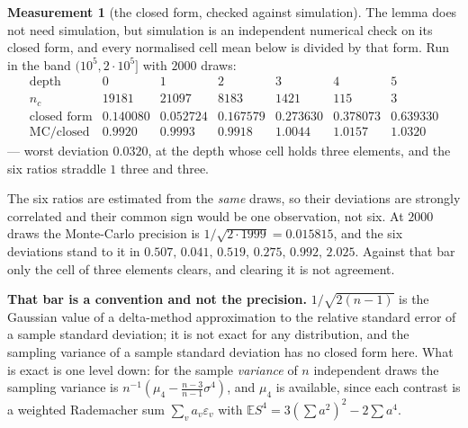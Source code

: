 \documentclass[11pt,a4paper]{article}
\theoremstyle{plain}
\theoremstyle{definition}
\newtheorem{measurement}[theorem]{Measurement}
\theoremstyle{remark}
\begin{document}
\begin{measurement}[the closed form, checked against simulation]%
\label{meas:mc}
The lemma does not need simulation, but simulation is an independent
numerical check on its closed form, and every normalised cell mean
below is divided by that form. Run in the band $(10^5,2\cdot10^5]$ with
$2000$ draws:
\[
\begin{array}{r|cccccc}
 \text{depth} & 0 & 1 & 2 & 3 & 4 & 5\\
 n_c & 19181 & 21097 & 8183 & 1421 & 115 & 3\\\hline
 \text{closed form} & 0.140080 & 0.052724 & 0.167579 & 0.273630
   & 0.378073 & 0.639330\\
 \text{MC}/\text{closed} & 0.9920 & 0.9993
   & 0.9918 & 1.0044 & 1.0157 & 1.0320
\end{array}
\]
--- worst deviation $0.0320$, at the depth whose cell holds three
elements, and the six ratios straddle $1$ three and three.

The six ratios are estimated from the \emph{same} draws, so their
deviations are strongly correlated and their common sign would be one
observation, not six. At $2000$ draws the Monte-Carlo precision is
$1/\sqrt{2\cdot1999}=0.015815$, and the six deviations stand to it
in $0.507,\,0.041,\,0.519,\,0.275,\,0.992,\,2.025$. Against that bar
only the cell of three elements clears, and clearing it is not
agreement.

\textbf{That bar is a convention and not the precision.}
$1/\sqrt{2(n-1)}$ is the Gaussian value of a delta-method
approximation to the relative standard error of a sample standard
deviation; it is not exact for any distribution, and the sampling
variance of a sample standard deviation has no closed form here. What
is exact is one level down: for the sample \emph{variance} of $n$
independent draws the sampling variance is
$n^{-1}(\mu_4-\tfrac{n-3}{n-1}\sigma^4)$, and $\mu_4$ is available,
since each contrast is a weighted Rademacher sum
$\sum_v a_v\varepsilon_v$ with
$\mathbb E S^4=3(\sum a^2)^2-2\sum a^4$.


\end{measurement}
\end{document}
